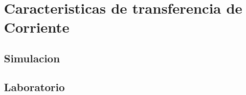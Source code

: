\chapter{Caracteristicas de transferencia de Corriente}

  \section{Simulacion}

  \section{Laboratorio}


